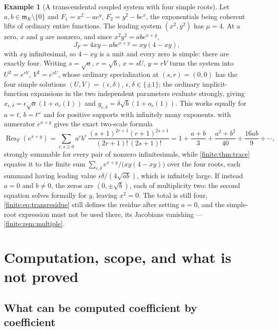 \documentclass[11pt,letterpaper]{article}
\theoremstyle{definition}
\newtheorem{example}[theorem]{Example}
\theoremstyle{remark}
\newcommand{\mm}{\mathfrak m}
\DeclareMathOperator{\Res}{Res}
\numberwithin{equation}{section}
\begin{document}
\begin{example}[A transcendental coupled system with four simple roots]
\label{finite:ex:transcendental}
Let $a,b\in\mm_K\setminus\{0\}$ and $F_1=x^2-ae^y$, $F_2=y^2-be^x$, the exponentials being coherent lifts of ordinary entire functions. The leading system $(x^2,y^2)$ has $\mu=4$. At a zero, $x$ and $y$ are nonzero, and since $x^2y^2=abe^{x+y}$,
\[
 J_F=4xy-abe^{x+y}=xy(4-xy),
\]
with $xy$ infinitesimal, so $4-xy$ is a unit and every zero is simple: there are exactly four. Writing $s=\sqrt a$, $r=\sqrt b$, $x=sU$, $y=rV$ turns the system into $U^2=e^{rV}$, $V^2=e^{sU}$, whose ordinary specialization at $(s,r)=(0,0)$ has the four simple solutions $(U,V)=(\epsilon,\delta)$, $\epsilon,\delta\in\{\pm1\}$; the ordinary implicit-function expansions in the two independent parameters evaluate strongly, giving $x_{\epsilon,\delta}=\epsilon\sqrt a(1+o_v(1))$ and $y_{\epsilon,\delta}=\delta\sqrt b(1+o_v(1))$. This works equally for $a=t$, $b=t^\omega$ and for positive supports with infinitely many exponents.  with numerator $e^{x+y}$ gives the exact two-scale formula
\begin{equation}\label{finite:eq:transresidue}
 \Res_F(e^{x+y})=\sum_{r,s\geq0}a^rb^s\,
 \frac{(s+1)^{2r+1}(r+1)^{2s+1}}{(2r+1)!\,(2s+1)!}
 =1+\frac{a+b}3+\frac{a^2+b^2}{40}+\frac{16ab}9+\cdots,
\end{equation}
strongly summable for every pair of nonzero infinitesimals, while \cref{finite:thm:trace} equates it to the finite sum $\sum_{\epsilon,\delta}e^{x+y}/\bigl(xy(4-xy)\bigr)$ over the four roots, each summand having leading value $\epsilon\delta/(4\sqrt{ab})$, which is infinitely large. If instead $a=0$ and $b\neq0$, the zeros are $(0,\pm\sqrt b)$, each of multiplicity two: the second equation solves formally for $y$, leaving $x^2=0$. The total is still four, \eqref{finite:eq:transresidue} still defines the residue after setting $a=0$, and the simple-root expression must not be used there, its Jacobians vanishing --- \cref{finite:rem:multiple}.
\end{example}

\section{Computation, scope, and what is not proved}
\label{finite:sec:scope}

\subsection{What can be computed coefficient by coefficient}
\label{finite:sec:computation}
\end{document}
